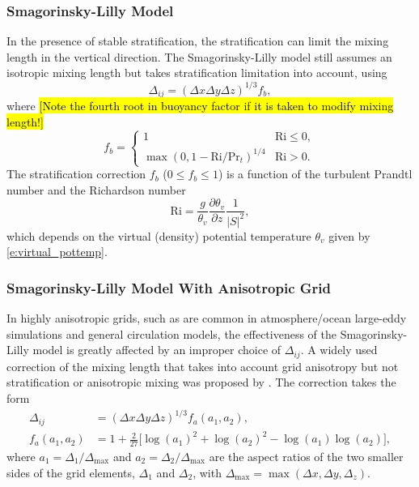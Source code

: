 \documentclass{article}
\begin{document}
\subsubsection{Smagorinsky-Lilly Model}

In the presence of stable stratification, the stratification can limit the mixing length  in the vertical direction. The Smagorinsky-Lilly model \citep{smagorinsky:1963, lilly:1962} still assumes an isotropic mixing length  but takes stratification limitation into account, using 
\begin{equation}\label{eq:smag-lilly}
\Delta_{ij} = (\Delta x \Delta y \Delta z)^{1/3} f_{b},   
\end{equation}
where \hl{[Note the fourth root in buoyancy factor if it is taken to modify mixing length!]}
\begin{equation}\label{eq:Lilly_strat}
f_{b} = 
    \begin{cases}
    1 & \mathrm{Ri} \leq 0 ,\\
    \max(0, 1 - \mathrm{Ri} / \mathrm{Pr}_{t})^{1/4} & \mathrm{Ri} > 0 .
    \end{cases}
\end{equation}
The stratification correction $f_{b}$ ($0 \leq f_b \leq 1$) is a function of the turbulent Prandtl number  and the Richardson number 
\[
\mathrm{Ri} = \frac{g}{\theta_v} \frac{\partial \theta_v}{\partial z} \frac{1}{{|S|}^2},
\]
which depends on the virtual (density) potential temperature $\theta_v$ given by \eqref{e:virtual_pottemp}.
 
\subsubsection{Smagorinsky-Lilly Model With Anisotropic Grid}
 
In highly anisotropic grids, such as are common in atmosphere/ocean large-eddy simulations and general circulation models, the effectiveness of the Smagorinsky-Lilly model is greatly affected by an improper choice of $\Delta_{ij}$. A widely used correction of the mixing length that takes into account grid anisotropy but not stratification or anisotropic mixing was proposed by  \citet{scottiMeneveauLilly1993}. The correction takes the form
\begin{align}
\Delta_{ij} &= (\Delta x \Delta y \Delta z)^{1/3} f_{a}(a_1, a_2),   \\
f_a(a_1, a_2) &= 1+\frac{2}{27}\Big[\log(a_{1})^2 + \log(a_2)^2 -\log(a_1)\log(a_2)\Big],
\end{align}
where  $a_1 =  \Delta_1/\Delta_{\max}$ and $a_2 = \Delta_2/\Delta_{\max}$ are the aspect ratios of the two smaller sides of the grid elements, $\Delta_1$ and $\Delta_2$, with $\Delta_{\max} = \max(\Delta x, \Delta y, \Delta_z)$. 
\end{document}
